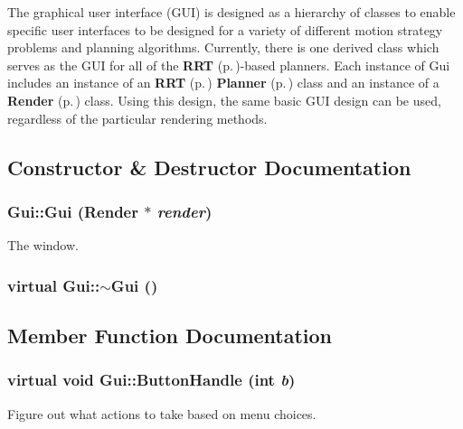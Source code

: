 The graphical user interface (GUI) is designed as a hierarchy of classes to enable specific user interfaces to be designed for a variety of different motion strategy problems and planning algorithms. Currently, there is one derived class which serves as the GUI for all of the {\bf RRT} {\rm (p.\,\pageref{classRRT})}-based planners. Each instance of Gui includes an instance of an {\bf RRT} {\rm (p.\,\pageref{classRRT})} {\bf Planner} {\rm (p.\,\pageref{classPlanner})} class and an instance of a {\bf Render} {\rm (p.\,\pageref{classRender})} class. Using this design, the same basic GUI design can be used, regardless of the particular rendering methods. 



\subsection{Constructor \& Destructor Documentation}
\subsubsection{\setlength{\rightskip}{0pt plus 5cm}Gui::Gui ({\bf Render} $\ast$ {\em render})}\label{classGui_a0}


The window.

\subsubsection{\setlength{\rightskip}{0pt plus 5cm}virtual Gui::$\sim$Gui ()\hspace{0.3cm}{\tt  [inline, virtual]}}\label{classGui_a1}




\subsection{Member Function Documentation}
\subsubsection{\setlength{\rightskip}{0pt plus 5cm}virtual void Gui::Button\-Handle (int {\em b})\hspace{0.3cm}{\tt  [inline, virtual]}}\label{classGui_a4}


Figure out what actions to take based on menu choices.



